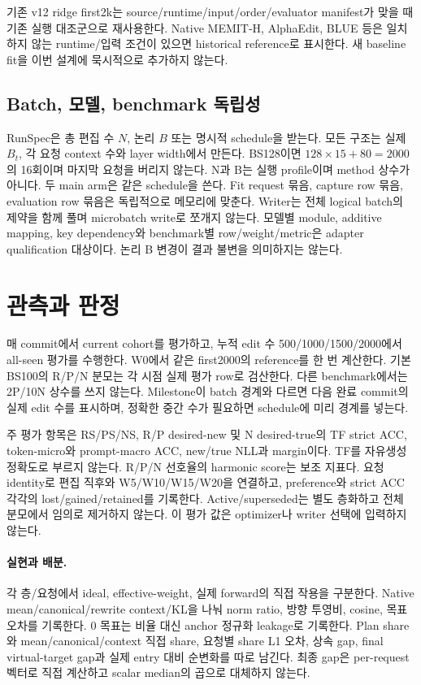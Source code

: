 \documentclass[11pt]{article}
\begin{document}
기존 v12 ridge first2k는 source/runtime/input/order/evaluator manifest가 맞을 때
기존 실행 대조군으로 재사용한다. Native MEMIT-H, AlphaEdit, BLUE 등은 일치하지
않는 runtime/입력 조건이 있으면 historical reference로 표시한다. 새 baseline
fit을 이번 설계에 묵시적으로 추가하지 않는다.

\subsection{Batch, 모델, benchmark 독립성}
RunSpec은 총 편집 수 $N$, 논리 $B$ 또는 명시적 schedule을 받는다. 모든 구조는
실제 $B_t$, 각 요청 context 수와 layer width에서 만든다. BS128이면
$128\times15+80=2000$의 16회이며 마지막 요청을 버리지 않는다.
N과 B는 실행 profile이며 method 상수가 아니다. 두 main arm은 같은 schedule을 쓴다.
Fit request 묶음, capture row 묶음, evaluation row 묶음은 독립적으로 메모리에
맞춘다. Writer는 전체 logical batch의 제약을 함께 풀며 microbatch write로 쪼개지 않는다.
모델별 module, additive mapping, key dependency와 benchmark별 row/weight/metric은
adapter qualification 대상이다. 논리 B 변경이 결과 불변을 의미하지는 않는다.

\section{관측과 판정}
매 commit에서 current cohort를 평가하고, 누적 edit 수 500/1000/1500/2000에서
all-seen 평가를 수행한다. W0에서 같은 first2000의 reference를 한 번 계산한다.
기본 BS100의 R/P/N 분모는 각 시점 실제 평가 row로 검산한다. 다른 benchmark에서는
2P/10N 상수를 쓰지 않는다. Milestone이 batch 경계와 다르면 다음 완료 commit의
실제 edit 수를 표시하며, 정확한 중간 수가 필요하면 schedule에 미리 경계를 넣는다.

주 평가 항목은 RS/PS/NS, R/P desired-new 및 N desired-true의 TF strict ACC,
token-micro와 prompt-macro ACC, new/true NLL과 margin이다. TF를 자유생성 정확도로
부르지 않는다. R/P/N 선호율의 harmonic score는 보조 지표다.
요청 identity로 편집 직후와 W5/W10/W15/W20을 연결하고, preference와 strict ACC
각각의 lost/gained/retained를 기록한다. Active/superseded는 별도 층화하고 전체
분모에서 임의로 제거하지 않는다. 이 평가 값은 optimizer나 writer 선택에 입력하지 않는다.

\paragraph{실현과 배분.}
각 층/요청에서 ideal, effective-weight, 실제 forward의 직접 작용을 구분한다.
Native mean/canonical/rewrite context/KL을 나눠 norm ratio, 방향 투영비, cosine,
목표 오차를 기록한다. 0 목표는 비율 대신 anchor 정규화 leakage로 기록한다.
Plan share와 mean/canonical/context 직접 share, 요청별 share L1 오차,
상속 gap, final virtual-target gap과 실제 entry 대비 순변화를 따로 남긴다.
최종 gap은 per-request 벡터로 직접 계산하고 scalar median의 곱으로 대체하지 않는다.
\end{document}
